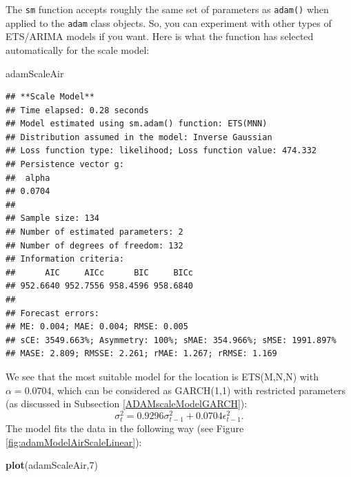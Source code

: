 \documentclass[]{book}
\newenvironment{Shaded}{\begin{snugshade}}{\end{snugshade}}
\newcommand{\DecValTok}[1]{\textcolor[rgb]{0.00,0.00,0.81}{#1}}
\newcommand{\KeywordTok}[1]{\textcolor[rgb]{0.13,0.29,0.53}{\textbf{#1}}}
\newcommand{\NormalTok}[1]{#1}
\theoremstyle{definition}
\theoremstyle{definition}
\theoremstyle{definition}
\theoremstyle{definition}
\theoremstyle{remark}
\begin{document}
The \texttt{sm} function accepts roughly the same set of parameters as \texttt{adam()} when applied to the \texttt{adam} class objects. So, you can experiment with other types of ETS/ARIMA models if you want. Here is what the function has selected automatically for the scale model:

\begin{Shaded}
\begin{Highlighting}[]
\NormalTok{adamScaleAir}
\end{Highlighting}
\end{Shaded}

\begin{verbatim}
## **Scale Model**
## Time elapsed: 0.28 seconds
## Model estimated using sm.adam() function: ETS(MNN)
## Distribution assumed in the model: Inverse Gaussian
## Loss function type: likelihood; Loss function value: 474.332
## Persistence vector g:
##  alpha 
## 0.0704 
## 
## Sample size: 134
## Number of estimated parameters: 2
## Number of degrees of freedom: 132
## Information criteria:
##      AIC     AICc      BIC     BICc 
## 952.6640 952.7556 958.4596 958.6840 
## 
## Forecast errors:
## ME: 0.004; MAE: 0.004; RMSE: 0.005
## sCE: 3549.663%; Asymmetry: 100%; sMAE: 354.966%; sMSE: 1991.897%
## MASE: 2.809; RMSSE: 2.261; rMAE: 1.267; rRMSE: 1.169
\end{verbatim}

We see that the most suitable model for the location is ETS(M,N,N) with \(\alpha=0.0704\), which can be considered as GARCH(1,1) with restricted parameters (as discussed in Subsection \ref{ADAMscaleModelGARCH}):
\begin{equation*}
    \sigma_t^2 = 0.9296 \sigma_{t-1}^2 + 0.0704 \epsilon_{t-1}^2 .
\end{equation*}
The model fits the data in the following way (see Figure \ref{fig:adamModelAirScaleLinear}):

\begin{Shaded}
\begin{Highlighting}[]
\KeywordTok{plot}\NormalTok{(adamScaleAir,}\DecValTok{7}\NormalTok{)}
\end{Highlighting}
\end{Shaded}
\end{document}
